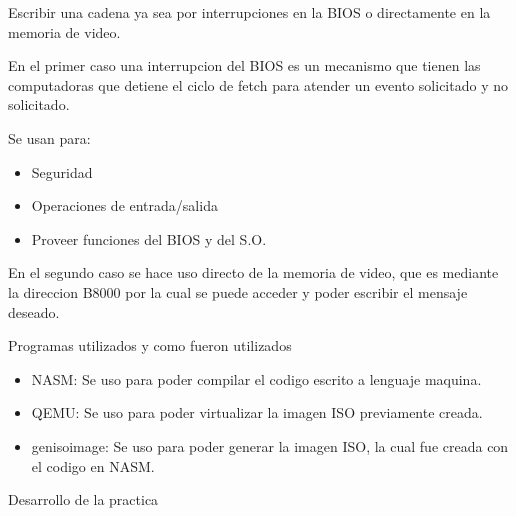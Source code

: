 \documentclass[12pt, a4paper]{report}
\begin{document}
\begin{flushleft}


Escribir una cadena ya sea por interrupciones en la BIOS o directamente en la memoria de video.


\bigskip

En el primer caso una interrupcion del BIOS es un mecanismo que tienen las computadoras que detiene el ciclo de fetch para atender un evento solicitado y no solicitado.


\bigskip
Se usan para:
\begin{flushleft}
\begin{itemize}
\item Seguridad
\item Operaciones de entrada/salida
\item Proveer funciones del BIOS y del S.O.
\end{itemize}
\end{flushleft}

\bigskip

En el segundo caso se hace uso directo de la memoria de video, que es mediante la direccion B8000 por la cual se puede acceder y poder escribir el mensaje deseado.

\bigskip
\bigskip

\end{flushleft}




\newpage

\begin{center}
Programas utilizados y como fueron utilizados
\end{center}

\bigskip
\bigskip

\begin{flushleft}
\begin{itemize}
\item NASM: Se uso para poder compilar el codigo escrito a lenguaje maquina.
\item QEMU: Se uso para poder virtualizar la imagen ISO previamente creada.
\item genisoimage: Se uso para poder generar la imagen ISO, la cual fue creada con el codigo en NASM.
\end{itemize}
\end{flushleft}

\newpage

\begin{center}
Desarrollo de la practica
\end{center}
\end{document}
